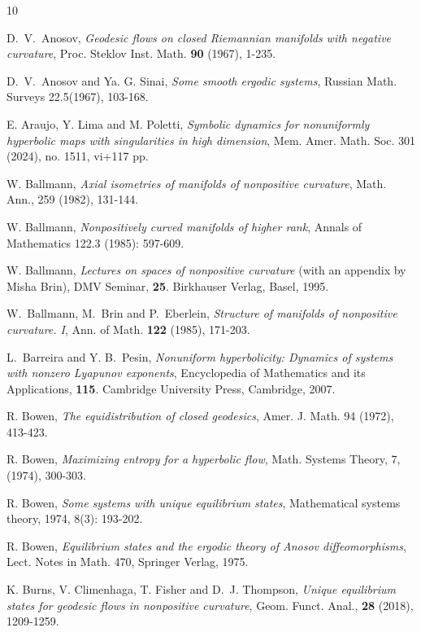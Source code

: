\documentclass[11pt]{amsart}
\theoremstyle{definition}
\begin{document}
\begin{thebibliography}{10}


D.~V.~Anosov, \emph{Geodesic flows on closed Riemannian manifolds with negative curvature}, Proc. Steklov Inst. Math. {\bf 90} (1967), 1-235.

D.~V.~Anosov and Ya. G. Sinai, \emph{Some smooth ergodic systems}, Russian Math. Surveys 22.5(1967), 103-168.

E. Araujo, Y. Lima and M. Poletti, \emph{Symbolic dynamics for nonuniformly hyperbolic maps with singularities in high dimension}, Mem. Amer. Math. Soc. 301 (2024), no. 1511, vi+117 pp.

W. Ballmann, \emph{Axial isometries of manifolds of nonpositive curvature}, Math. Ann., 259 (1982), 131-144.

W. Ballmann, \emph{Nonpositively curved manifolds of higher rank}, Annals of Mathematics 122.3 (1985): 597-609.

W. Ballmann, \emph{Lectures on spaces of nonpositive curvature} (with an appendix by Misha Brin),
DMV Seminar, \textbf{25}. Birkhauser Verlag, Basel, 1995.

W.~Ballmann, M.~Brin and P.~Eberlein, \emph{Structure of manifolds of nonpositive curvature. I}, Ann. of Math. {\bf 122} (1985), 171-203.

L.~Barreira and Y. B.~Pesin, \emph{Nonuniform hyperbolicity: Dynamics of systems with nonzero Lyapunov exponents}, Encyclopedia of Mathematics and its Applications, \textbf{115}. Cambridge University Press, Cambridge, 2007.

R. Bowen, \emph{The equidistribution of closed geodesics}, Amer. J. Math. 94 (1972), 413-423.

 R. Bowen,
   \emph{Maximizing entropy for a hyperbolic flow}, Math. Systems Theory, 7, (1974), 300-303.

R. Bowen, \emph{Some systems with unique equilibrium states}, Mathematical systems theory, 1974, 8(3): 193-202.




R. Bowen, \emph{Equilibrium states and the ergodic theory of Anosov diffeomorphisms}, Lect. Notes in Math. 470, Springer Verlag, 1975.

K. Burns, V. Climenhaga, T. Fisher and D.~J. Thompson, \emph{Unique equilibrium states for geodesic flows in nonpositive curvature},
Geom. Funct. Anal., \textbf{28} (2018), 1209-1259.


\end{thebibliography}
\end{document}
